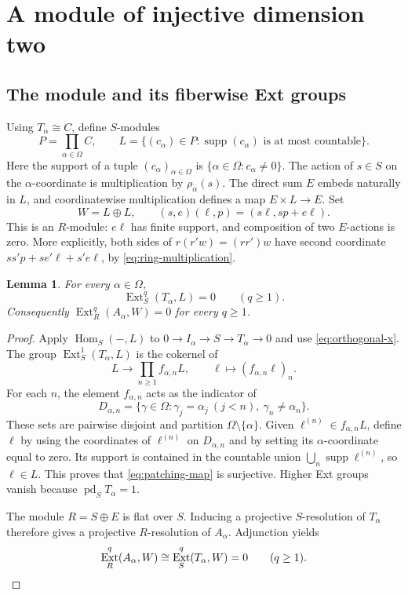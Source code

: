 \documentclass[11pt]{amsart}
\newtheorem{lemma}[theorem]{Lemma}
\theoremstyle{definition}
\DeclareMathOperator{\pd}{pd}
\DeclareMathOperator{\Hom}{Hom}
\DeclareMathOperator{\Ext}{Ext}
\DeclareMathOperator{\supp}{supp}
\numberwithin{equation}{section}
\begin{document}
\section{A module of injective dimension two}

\subsection{The module and its fiberwise Ext groups}

Using $T_\alpha\cong C$, define $S$-modules
\begin{equation}\label{eq:P-L}
 P=\prod_{\alpha\in\Omega}C,\qquad
 L=\{(c_\alpha)\in P:\supp(c_\alpha)\text{ is at most countable}\}.
\end{equation}
Here the support of a tuple $(c_\alpha)_{\alpha\in\Omega}$ is
$\{\alpha\in\Omega:c_\alpha\ne0\}$.
The action of $s\in S$ on the $\alpha$-coordinate is multiplication
by $\rho_\alpha(s)$. The direct sum $E$ embeds naturally in $L$,
and coordinatewise multiplication defines a map $E\times L\to E$.
Set
\begin{equation}\label{eq:W}
 W=L\oplus L,\qquad
 (s,e)(\ell,p)=(s\ell,sp+e\ell).
\end{equation}
This is an $R$-module: $e\ell$ has finite support, and composition
of two $E$-actions is zero. More explicitly, both sides of
$r(r'w)=(rr')w$ have second coordinate
$ss'p+se'\ell+s'e\ell$, by \eqref{eq:ring-multiplication}.

\begin{lemma}\label{lem:patching}
For every $\alpha\in\Omega$,
\[
 \Ext_S^q(T_\alpha,L)=0\qquad(q\geq1).
\]
Consequently $\Ext_R^q(A_\alpha,W)=0$ for every $q\geq1$.
\end{lemma}

\begin{proof}
Apply $\Hom_S(-,L)$ to
$0\to I_\alpha\to S\to T_\alpha\to0$ and use
\eqref{eq:orthogonal-x}. The group $\Ext_S^1(T_\alpha,L)$ is the
cokernel of
\begin{equation}\label{eq:patching-map}
 L\longrightarrow\prod_{n\geq1}f_{\alpha,n}L,
       \qquad\ell\longmapsto(f_{\alpha,n}\ell)_n.
\end{equation}
For each $n$, the element $f_{\alpha,n}$ acts as the indicator of
\[
 D_{\alpha,n}=\{\gamma\in\Omega:
   \gamma_j=\alpha_j\ (j<n),\ \gamma_n\ne\alpha_n\}.
\]
These sets are pairwise disjoint and partition
$\Omega\setminus\{\alpha\}$. Given $\ell^{(n)}\in f_{\alpha,n}L$,
define $\ell$ by using the coordinates of $\ell^{(n)}$ on
$D_{\alpha,n}$ and by setting its $\alpha$-coordinate equal to zero.
Its support is contained in the countable union
$\bigcup_n\supp\ell^{(n)}$, so $\ell\in L$.
This proves that \eqref{eq:patching-map} is surjective. Higher Ext
groups vanish because $\pd_S T_\alpha=1$.

The module $R=S\oplus E$ is flat over $S$. Inducing a projective
$S$-resolution of $T_\alpha$ therefore gives a projective
$R$-resolution of $A_\alpha$. Adjunction yields
\[
 \Ext_R^q(A_\alpha,W)\cong\Ext_S^q(T_\alpha,W)=0\qquad(q\geq1). \qedhere
\] 
\end{proof}
\end{document}

